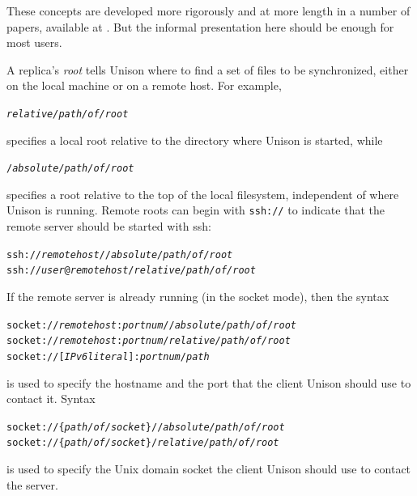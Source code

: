 \documentclass{article}
\newcommand{\NT}[1]{\textit{#1}}
\begin{document}
These concepts are developed more rigorously and at more length in a number
of papers, available at .
But the informal presentation here should be enough for most users.



A replica's {\em root} tells Unison where to find a set of files to be
synchronized, either on the local machine or on a remote host.
For example,
\begin{alltt}
      \NT{relative/path/of/root}
\end{alltt}
\noindent
specifies a local root relative to the directory where Unison is
started, while
\begin{alltt}
      /\NT{absolute/path/of/root}
\end{alltt}
\noindent
specifies a root relative to the top of the local filesystem,
independent of where Unison is running.  Remote roots can begin with
\verb|ssh://|
to indicate that the remote server should be started with ssh:
\begin{alltt}
      ssh://\NT{remotehost}//\NT{absolute/path/of/root}
      ssh://\NT{user}@\NT{remotehost}/\NT{relative/path/of/root}
\end{alltt}
If the remote server is already running (in the socket mode), then the syntax
\begin{alltt}
      socket://\NT{remotehost}:\NT{portnum}//\NT{absolute/path/of/root}
      socket://\NT{remotehost}:\NT{portnum}/\NT{relative/path/of/root}
      socket://[\NT{IPv6literal}]:\NT{portnum}/\NT{path}
\end{alltt}
\noindent
is used to specify the hostname and the port that the client Unison should
use to contact it.
Syntax
\begin{alltt}
      socket://\textrm{\{}\NT{path/of/socket}\textrm{\}}//\NT{absolute/path/of/root}
      socket://\textrm{\{}\NT{path/of/socket}\textrm{\}}/\NT{relative/path/of/root}
\end{alltt}
\noindent
is used to specify the Unix domain socket the client Unison should use to
contact the server.
\end{document}
